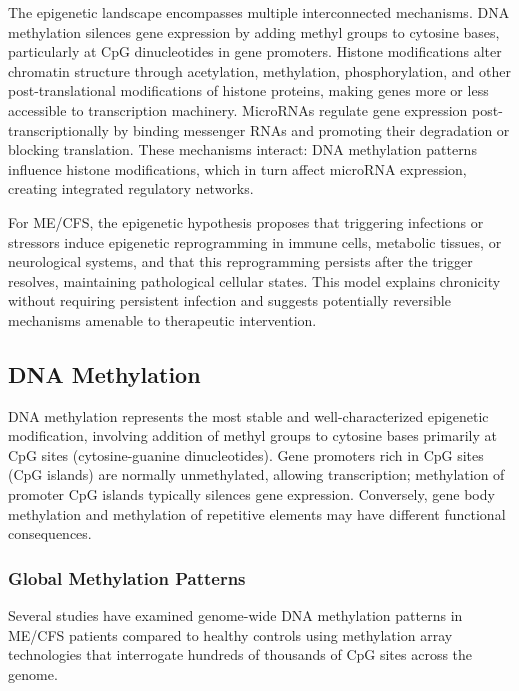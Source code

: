 The epigenetic landscape encompasses multiple interconnected mechanisms. DNA methylation silences gene expression by adding methyl groups to cytosine bases, particularly at CpG dinucleotides in gene promoters. Histone modifications alter chromatin structure through acetylation, methylation, phosphorylation, and other post-translational modifications of histone proteins, making genes more or less accessible to transcription machinery. MicroRNAs regulate gene expression post-transcriptionally by binding messenger RNAs and promoting their degradation or blocking translation. These mechanisms interact: DNA methylation patterns influence histone modifications, which in turn affect microRNA expression, creating integrated regulatory networks.

For ME/CFS, the epigenetic hypothesis proposes that triggering infections or stressors induce epigenetic reprogramming in immune cells, metabolic tissues, or neurological systems, and that this reprogramming persists after the trigger resolves, maintaining pathological cellular states. This model explains chronicity without requiring persistent infection and suggests potentially reversible mechanisms amenable to therapeutic intervention.

\subsection{DNA Methylation}
\label{sec:dna-methylation}

DNA methylation represents the most stable and well-characterized epigenetic modification, involving addition of methyl groups to cytosine bases primarily at CpG sites (cytosine-guanine dinucleotides). Gene promoters rich in CpG sites (CpG islands) are normally unmethylated, allowing transcription; methylation of promoter CpG islands typically silences gene expression. Conversely, gene body methylation and methylation of repetitive elements may have different functional consequences.

\subsubsection{Global Methylation Patterns}

Several studies have examined genome-wide DNA methylation patterns in ME/CFS patients compared to healthy controls using methylation array technologies that interrogate hundreds of thousands of CpG sites across the genome.

